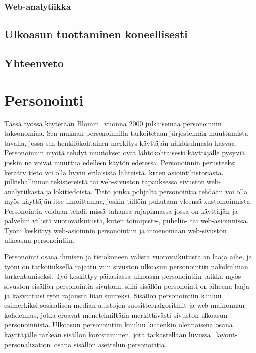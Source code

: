 \documentclass[finnish, 12pt, a4paper, elec, utf8, a-1b, online]{aaltothesis}
\begin{document}

\subsubsection{Web-analytiikka}

\subsection{Ulkoasun tuottaminen koneellisesti}


\subsection{Yhteenveto}

\clearpage

\section{Personointi}\label{personalization}

Tässä työssä käytetään Blomin~\cite{10.1145/633292.633483} vuonna 2000
julkaisemaa personoinnin taksonomiaa. Sen mukaan personoinnilla tarkoitetaan
järjestelmän muuttamista tavalla, jossa sen henkilökohtainen merkitys käyttäjän
näkökulmasta kasvaa. Personoinnin myötä tehdyt muutokset ovat lähtökohtaisesti
käyttäjälle pysyviä, joskin ne voivat muuttua edelleen käytön edetessä.
Personoinnin perusteeksi kerätty tieto voi olla hyvin erilaisista lähteistä,
kuten asiointihistoriasta, julkishallinnon rekistereistä tai web-sivuston
tapauksessa sivuston web-analytiikasta ja lokitiedoista. Tieto jonka pohjalta
personointia tehdään voi olla myös käyttäjän itse ilmoittamaa, joskin tällöin
puhutaan yleensä kustomoinnista. Personointia voidaan tehdä missä tahansa
rajapinnassa jossa on käyttäjän ja palvelun välistä vuorovaikutusta, kuten
toimipiste-, puhelin- tai web-asioinnissa. Työni keskittyy web-asioinnin
personointiin ja nimenomaan web-sivuston ulkoasun personointiin.

Personointi osana ihmisen ja tietokoneen välistä vuorovaikutusta on laaja aihe,
ja työni on tarkoituksella rajattu vain sivuston ulkoasun personointiin
näkökulman tarkentamiseksi. Työ keskittyy pääasiassa ulkoasun personointiin
vaikka myös sivuston sisällön personointia sivutaan, sillä sisällön
personointi on aiheena laaja ja kasvattaisi työn rajausta liian suureksi.
Sisällön personointiin kuuluu esimerkiksi sosiaalisen median alustojen
suosittelualgoritmit ja web-mainonnan kohdennus, jotka eroavat menetelmiltään
merkittävästi sivuston ulkoasun personoinnista. Ulkoasun personointiin
kuuluu kuitenkin olennaisena osana käyttäjälle tärkeän sisällön korostaminen,
jota tarkastellaan luvussa~\ref{layout-personalization} osana sisällön asettelun
personointia.
\end{document}
